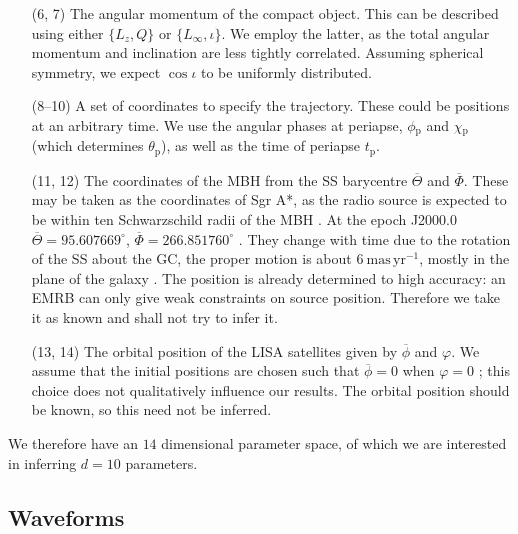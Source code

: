 \documentclass[useAMS,usedcolumn,usegraphicx,usenatbib]{mn2e}
\newcommand{\units}[1]{\ensuremath{~\mathrm{#1}}}
\newcommand{\sub}[1]{\ensuremath{_\mathrm{#1}}}
\begin{document}
\begin{enumerate}
\item[(6, 7)] The angular momentum of the compact object. This can be described using either $\{L_z, Q\}$ or $\{L_\infty, \iota\}$. We employ the latter, as the total angular momentum and inclination are less tightly correlated. Assuming spherical symmetry, we expect $\cos \iota$ to be uniformly distributed.
\item[(8--10)] A set of coordinates to specify the trajectory. These could be positions at an arbitrary time. We use the angular phases at periapse, $\phi\sub{p}$ and $\chi\sub{p}$ (which determines $\theta\sub{p}$), as well as the time of periapse $t\sub{p}$.
\item[(11, 12)] The coordinates of the MBH from the SS barycentre $\overline{\Theta}$ and $\overline{\Phi}$. These may be taken as the coordinates of Sgr A*, as the radio source is expected to be within ten Schwarzschild radii of the MBH \citep{Reid2003,Doeleman2008}. At the epoch J2000.0 $\overline{\Theta} = {95.607669}^{\circ}$, $\overline{\Phi} = {266.851760}^{\circ}$ \citep{Reid1999, Yusef-Zadeh1999}. They change with time due to the rotation of the SS about the GC, the proper motion is about $6\units{mas\,yr^{-1}}$, mostly in the plane of the galaxy \citep{Reid1999, Backer1999, Reid2003}. The position is already determined to high accuracy: an EMRB can only give weak constraints on source position. Therefore we take it as known and shall not try to infer it.
\item[(13, 14)] The orbital position of the LISA satellites given by $\overline{\phi}$ and $\varphi$. We assume that the initial positions are chosen such that $\overline{\phi} = 0$ when $\varphi = 0$ \citep{Cutler1998}; this choice does not qualitatively influence our results. The orbital position should be known, so this need not be inferred.\\
\end{enumerate}
We therefore have an $14$ dimensional parameter space, of which we are interested in inferring $d = 10$ parameters.

\subsection{Waveforms}
\end{document}
